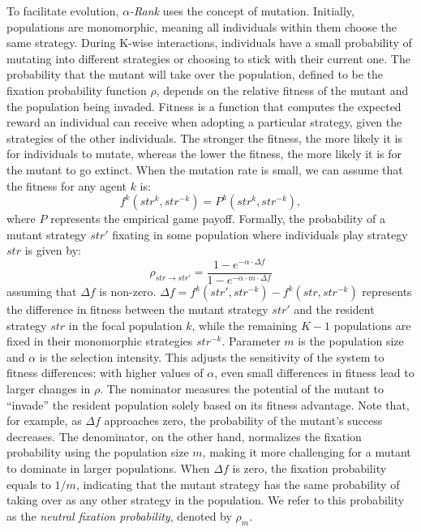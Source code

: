         \noindent
        To facilitate evolution, \emph{$\alpha$-Rank} uses the concept of mutation. Initially, populations are monomorphic, meaning all individuals within them choose the same strategy. During K-wise interactions, individuals have a small probability of mutating into different strategies or choosing to stick with their current one. The probability that the mutant will take over the population, defined to be the fixation probability function $\rho$, depends on the relative fitness of the mutant and the population being invaded. Fitness is a function that computes the expected reward an individual can receive when adopting a particular strategy, given the strategies of the other individuals. The stronger the fitness, the more likely it is for individuals to mutate, whereas the lower the fitness, the more likely it is for the mutant to go extinct. When the mutation rate is small, we can assume that the fitness for any agent $k$ is:
        \begin{equation}
            f^k(str^{k}, str^{-k}) = P^k(str^{k}, str^{-k}),
            \label{eq:fitness_k}
        \end{equation}
        where $P$ represents the empirical game payoff. Formally, the probability of a mutant strategy $str'$ fixating in some population where individuals play strategy $str$ is given by:
        \begin{equation}
            \rho_{str \to str'} = \frac{1 - e^{-\alpha \cdot \Delta f}}{1 - e^{-\alpha \cdot m \cdot \Delta f}} 
            \label{eq:fixation_prob}
        \end{equation}
        assuming that $\Delta f$ is non-zero. $\Delta f = f^k(str', str^{-k}) - f^k(str, str^{-k})$ represents the difference in fitness between the mutant strategy $str'$ and the resident strategy $str$ in the focal population $k$, while the remaining $K - 1$ populations are fixed in their monomorphic strategies $str^{-k}$. Parameter $m$ is the population size and $\alpha$ is the selection intensity. This adjusts the sensitivity of the system to fitness differences: with higher values of $\alpha$, even small differences in fitness lead to larger changes in $\rho$. The nominator measures the potential of the mutant to ``invade'' the resident population solely based on its fitness advantage. Note that, for example, as $\Delta f$ approaches zero, the probability of the mutant's success decreases. The denominator, on the other hand, normalizes the fixation probability using the population size $m$, making it more challenging for a mutant to dominate in larger populations. When $\Delta f$ is zero, the fixation probability equals to $1/m$, indicating that the mutant strategy has the same probability of taking over as any other strategy in the population. We refer to this probability as the \emph{neutral fixation probability}, denoted by $\rho_m$.


